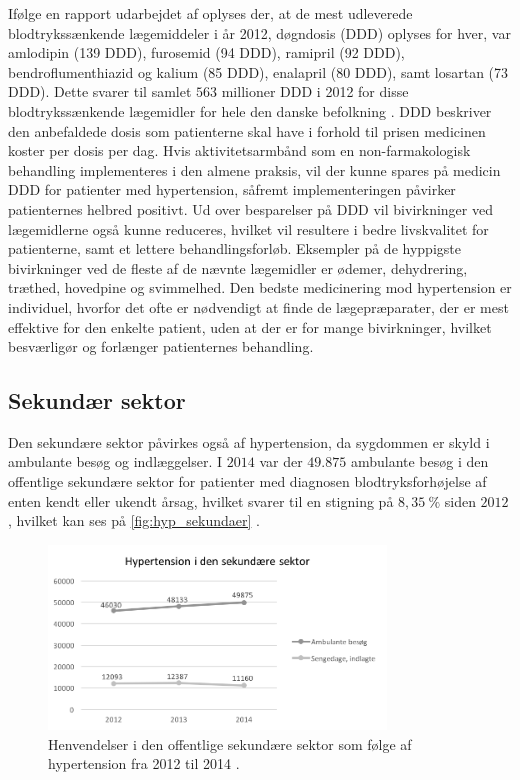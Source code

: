 Ifølge en rapport udarbejdet af \citeauthor{apotekerforeningen2012} oplyses der, at de mest udleverede blodtrykssænkende lægemiddeler i år 2012, døgndosis (DDD) oplyses for hver, var amlodipin (139 DDD), furosemid (94 DDD), ramipril (92 DDD), bendroflumenthiazid og kalium (85 DDD), enalapril (80 DDD), samt losartan (73 DDD). Dette svarer til samlet $563$ millioner DDD i 2012 for disse blodtrykssænkende lægemidler for hele den danske befolkning \citep{apotekerforeningen2012}. DDD beskriver den anbefaldede dosis som patienterne skal have i forhold til prisen medicinen koster per dosis per dag. Hvis aktivitetsarmbånd som en non-farmakologisk  behandling implementeres i den almene praksis, vil der kunne spares på medicin DDD for patienter med hypertension, såfremt implementeringen påvirker patienternes helbred positivt. Ud over besparelser på DDD vil bivirkninger ved lægemidlerne også kunne reduceres, hvilket vil resultere i bedre livskvalitet for patienterne, samt et lettere behandlingsforløb. Eksempler på de hyppigste bivirkninger ved de fleste af de nævnte lægemidler er ødemer, dehydrering, træthed, hovedpine og svimmelhed. Den bedste medicinering mod hypertension er individuel, hvorfor det ofte er nødvendigt at finde de lægepræparater, der er mest effektive for den enkelte patient, uden at der er for mange bivirkninger, hvilket besværligør og forlænger patienternes behandling.

\subsection{Sekundær sektor}
Den sekundære sektor påvirkes også af hypertension, da sygdommen er skyld i ambulante besøg og indlæggelser. I $2014$ var der $49.875$ ambulante besøg i den offentlige sekundære sektor for patienter med diagnosen blodtryksforhøjelse af enten kendt eller ukendt årsag, hvilket svarer til en stigning på $8,35~\%$ siden $2012$, hvilket kan ses på \autoref{fig:hyp_sekundaer} \citep{sundhedsdatastyrelsen2016}. 

\begin{figure}[H]
\centering
\includegraphics[width=0.8\textwidth]{figures/hyp_sekundaer}
\caption{Henvendelser i den offentlige sekundære sektor som følge af hypertension fra 2012 til 2014 \citep{sundhedsdatastyrelsen2016}.}
\label{fig:hyp_sekundaer}
\end{figure}

